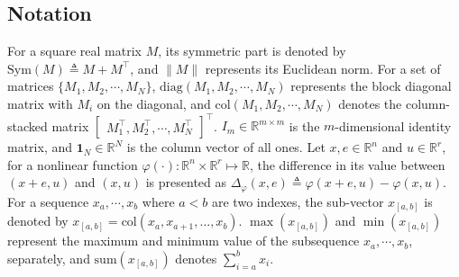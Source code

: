 \documentclass{ifacconf}
\begin{document}
\subsection{Notation}
\vspace*{-0.3 cm}
For a square real matrix $M$, its symmetric part is denoted by $\mathrm{Sym}(M) \triangleq M + M^{\top}$, and $\|M\|$ represents its Euclidean norm. For a set of matrices $\{M_1, M_2, \cdots, M_N\}$, $\mathrm{diag}(M_1, M_2, \cdots, M_N)$ represents the block diagonal matrix with $M_i$ on the diagonal, and $\mathrm{col}(M_1, M_2, \cdots, M_N)$ denotes the column-stacked matrix $\begin{bmatrix} M_1^{\top}, M_2^{\top}, \cdots, M_N^{\top} \end{bmatrix}^{\top}$. $I_m \in \mathbb{R}^{m \times m}$ is the $m$-dimensional identity matrix, and $\mathbf{1}_{N} \in \mathbb{R}^{N}$ is the column vector of all ones. Let $x,e\in\mathbb{R}^n$ and $u\in\mathbb{R}^r$, for a nonlinear function $\varphi(\cdot):\mathbb{R}^n\times\mathbb{R}^r\mapsto\mathbb{R}$, the difference in its value between $(x+e,u)$ and $(x,u)$ is presented as $\Delta_{\varphi}(x,e)\triangleq\varphi(x+e,u)-\varphi(x,u)$. For a sequence $x_a,\cdots,x_b$ where $a<b$ are two indexes, the sub-vector $x_{[a,b]}$ is denoted by $x_{[a,b]} = \mathrm{col}(x_a, x_{a+1}, \dots, x_b)$. $\max(x_{[a,b]})$ and $\min(x_{[a,b]})$ represent the maximum and minimum value of the subsequence $x_a,\cdots,x_b$, separately, and $\mathrm{sum}(x_{[a,b]})$ denotes $\sum^b_{i=a}x_i$.
\end{document}
